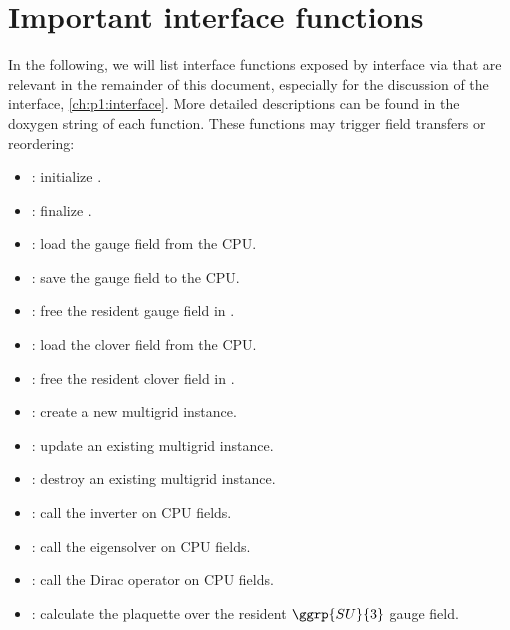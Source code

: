 
\section{Important interface functions}
\label{sec:quda:interface}

In the following, we will list interface functions exposed by \qudas interface via  that are relevant in the remainder of this document, especially for the discussion of the interface, \cref{ch:p1:interface}.
More detailed descriptions can be found in the doxygen string of each function.
These functions may trigger field transfers or reordering:

\begin{itemize}
  \item {}: initialize \quda.
  \item {}: finalize \quda.
  \item {}: load the gauge field from the CPU.
  \item {}: save the gauge field to the CPU.
  \item {}: free the resident gauge field in \quda.
  \item {}: load the clover field from the CPU.
  \item {}: free the resident clover field in \quda.
  \item {}: create a new multigrid instance.
  \item {}: update an existing multigrid instance.
  \item {}: destroy an existing multigrid instance.
  \item {}: call the inverter on CPU fields.
  \item {}: call the eigensolver on CPU fields.
  \item {}: call the Dirac operator on CPU fields.
  \item {}: calculate the plaquette over the resident $\ggrp{SU}{3}$ gauge field.
\end{itemize} 

